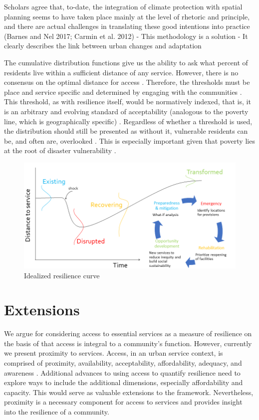 \documentclass[9pt,twocolumn,twoside,lineno]{pnas-new}
\begin{document}
	Scholars agree that, to-date, the integration of climate protection with spatial planning seems to have taken place mainly at the level of rhetoric and principle, and there are actual challenges in translating these good intentions into practice (Barnes and Nel 2017; Carmin et al. 2012)
		- This methodology is a solution
		- It clearly describes the link between urban changes and adaptation



The cumulative distribution functions give us the ability to ask what percent of residents live within a sufficient distance of any service. However, there is no consensus on the optimal distance for access \cite{Dempsey2008-hr}. Therefore, the thresholds must be place and service specific and determined by engaging with the communities \cite{Pantelic1991-qu}. This threshold, as with resilience itself, would be normatively indexed, that is, it is an arbitrary and evolving standard of acceptability (analogous to the poverty line, which is geographically specific) \cite{Constas2014-ui}. Regardless of whether a threshold is used, the distribution should still be presented as without it, vulnerable residents can be, and often are, overlooked \cite{Logan2017-fr}. This is especially important given that poverty lies at the root of disaster vulnerability \cite{Pantelic1991-qu}.


\begin{figure}
    \centering
    \includegraphics[width=0.8\linewidth]{report/fig/Figure_2.png}
    \caption{Idealized resilience curve }
    \label{fig:haz_cycle}
\end{figure}

\section*{Extensions}
We argue for considering access to essential services as a measure of resilience on the basis of that access is integral to a community's function.
However, currently we present proximity to services. 
Access, in an urban service context, is comprised of proximity, availability, acceptability, affordability, adequacy, and awareness \cite{Saurman2016-gj, Penchansky1981-qh}. 
Additional advances to using access to quantify resilience need to explore ways to include the additional dimensions, especially affordability and capacity.
This would serve as valuable extensions to the framework.
Nevertheless, proximity is a necessary component for access to services and provides insight into the resilience of a community. 
\end{document}
